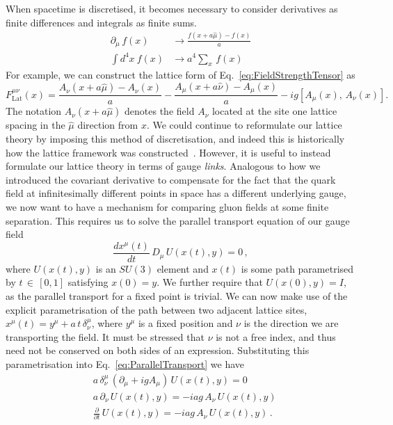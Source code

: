 When spacetime is discretised, it becomes necessary to consider derivatives as finite differences and integrals as finite sums.
\begin{align*}
\partial_\mu\,f(x)&\rightarrow \frac{f(x+a\hat{\mu})-f(x)}{a}\\
\int d^4x~f(x) &\rightarrow a^4\sum_x \,f(x)
\end{align*}
For example, we can construct the lattice form of Eq.~\ref{eq:FieldStrengthTensor} as
%
\begin{equation}
F_{\text{Lat}}^{\mu\nu}(x) = \frac{A_\nu(x+a\hat{\mu})-A_\nu(x)}{a}-\frac{A_\mu(x+a\hat{\nu})-A_\mu(x)}{a}-ig[A_\mu(x),\,A_\nu(x)].
\label{eq:DiscreteFST}
\end{equation}
%
The notation $A_\nu(x+a\hat{\mu})$ denotes the field $A_\nu$ located at the site one lattice spacing in the $\hat{\mu}$ direction from $x$. We could continue to reformulate our lattice theory by imposing this method of discretisation, and indeed this is historically how the lattice framework was constructed~\cite{Wilson:1974sk}. However, it is useful to instead formulate our lattice theory in terms of gauge {\it links}. Analogous to how we introduced the covariant derivative to compensate for the fact that the quark field at infinitesimally different points in space has a different underlying gauge, we now want to have a mechanism for comparing gluon fields at some finite separation. This requires us to solve the parallel transport equation of our gauge field~\cite{Bing:1999ee,peskin2018introduction}
%
\begin{equation}
\frac{dx^\mu(t)}{dt}\,D_\mu \,U(x(t),y)=0\, ,
\label{eq:ParallelTransport}
\end{equation}
%
where $U(x(t),y)$ is an $SU(3)$ element and $x(t)$ is some path parametrised by $t\,\in\,[0,1]$ satisfying $x(0)=y$. We further require that $U(x(0),y)=I$, as the parallel transport for a fixed point is trivial. We can now make use of the explicit parametrisation of the path between two adjacent lattice sites, $x^\mu(t) = y^\mu+a\,t\,\delta_\nu^\mu$, where $y^\mu$ is a fixed position and $\nu$ is the direction we are transporting the field. It must be stressed that $\nu$ is not a free index, and thus need not be conserved on both sides of an expression. Substituting this parametrisation into Eq.~\ref{eq:ParallelTransport} we have
\begin{align*}
&a\, \delta_\nu^\mu\, (\partial_\mu + igA_\mu)\,U(x(t),y)=0\\
&a\, \partial_\nu\, U(x(t),y) = -iag\, A_\nu\,U(x(t),y)\\
&\frac{\partial}{\partial t}\, U(x(t),y) = -iag\,A_\nu\, U(x(t),y)\, .
\end{align*}
